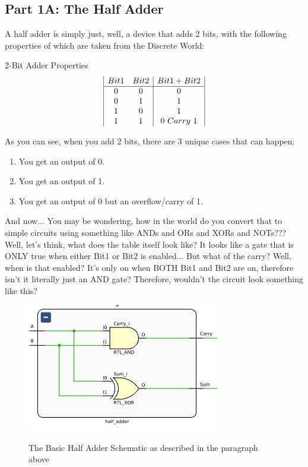 \subsection{Part 1A: The Half Adder}
\qquad
A half adder is simply just, well, a device that adds 2 bits, with the following properties of which are taken from the Discrete World:
\begin{center}
    2-Bit Adder Properties
    \begin{displaymath}
    \begin{array}{|c c|c|}
    Bit1 & Bit2 & Bit1 + Bit2\\
    \hline
    0 & 0 & 0\\
    0 & 1 & 1\\
    1 & 0 & 1\\
    1 & 1 & 0\ Carry\ 1\\
    \end{array}
    \end{displaymath}
\end{center}

As you can see, when you add 2 bits, there are 3 unique cases that can happen:
\begin{enumerate}
      \item You get an output of 0.
      \item You get an output of 1.
      \item You get an output of 0 but an overflow/carry of 1.
\end{enumerate}

And now... You may be wondering, how in the world do you convert that to simple circuits using something like ANDs and ORs and XORs and NOTs??? Well, let's think, what does the table itself look like? It looks like a gate that is ONLY true when either Bit1 or Bit2 is enabled...
But what of the carry? Well, when is that enabled? It's only on when BOTH Bit1 and Bit2 are on, therefore isn't it literally just an AND gate? Therefore, wouldn't the circuit look something like this?
\begin{figure}[!htbp]
    \centering
    \caption{The Basic Half Adder Schematic as described in the paragraph above}
    \includegraphics[width=0.75\textwidth]{pictures/part1/basic_half_adder.png}
    \label{Basic 2-Bit Adder}
\end{figure}

